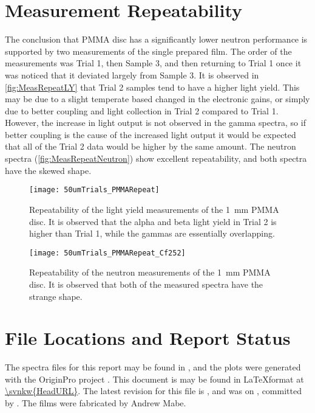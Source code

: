 \documentclass[draftcls,onecolumn]{IEEEtran}
\begin{document}
\section{Measurement Repeatability}
\label{sec:MeasRepeat}
The conclusion that PMMA disc has a significantly lower neutron performance is supported by two measurements of the single prepared film.
The order of the measurements was Trial 1, then Sample 3, and then returning to Trial 1 once it was noticed that it deviated largely from Sample 3.
It is observed in \autoref{fig:MeasRepeatLY} that Trial 2 samples tend to have a higher light yield. 
This may be due to a slight temperate based changed in the electronic gains, or simply due to better coupling and light collection in Trial 2 compared to Trial 1.
However, the increase in light output is not observed in the gamma spectra, so if better coupling is the cause of the increased light output it would be expected that all of the Trial 2 data would be higher by the same amount.
The neutron spectra (\autoref{fig:MeasRepeatNeutron}) show excellent repeatability, and both spectra have the skewed shape.
\begin{figure}
  \centering
  \texttt{[image: 50umTrials\_PMMARepeat]}
  \caption[PMMA Light Yield Repeatability]{Repeatability of the light yield measurements of the \SI{1}{\mm} PMMA disc. It is observed that the alpha and beta light yield in Trial 2 is higher than Trial 1, while the gammas are essentially overlapping.}
  \label{fig:MeasRepeatLY}
\end{figure}
\begin{figure}
  \centering
  \texttt{[image: 50umTrials\_PMMARepeat\_Cf252]}
  \caption[PMMA Neutron Repeatability]{Repeatability of the neutron measurements of the \SI{1}{\mm} PMMA disc. It is observed that both of the measured spectra have the strange shape.}
  \label{fig:MeasRepeatNeutron}
\end{figure}

\section{File Locations and Report Status}
The spectra files for this report may be found in , and the plots were generated with the OriginPro project .
This document is may be found in \LaTeX format at \url{\svnkw{HeadURL}}.  
The latest revision for this file is \svnrev, and was on \svndate, committed by \svnauthor.
The films were fabricated by Andrew Mabe.
\end{document}
